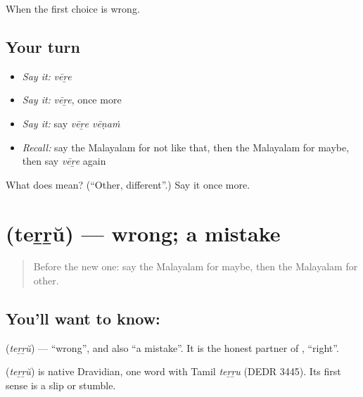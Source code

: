 \begin{grammarlens}[title={What you've built}]
When the first choice is wrong.
\end{grammarlens}

\subsection*{Your turn}
\begin{itemize}
\raggedright
  \item \emph{Say it:} \emph{vēṟe}
  \item \emph{Say it:} \emph{vēṟe}, once more
  \item \emph{Say it:} say \emph{vēṟe vēṇaṁ}
  \item \emph{Recall:} say the Malayalam for not like that, then the Malayalam for maybe, then say \emph{vēṟe} again
\end{itemize}

\begin{tcolorbox}[breakable,colback=teal!4,colframe=teal!35!black,title={Before you move on}]
What does  mean? (\textquotedblleft{}Other, different\textquotedblright{}.) Say it once more.
\end{tcolorbox}
\section[\texorpdfstring{\ml{തെറ്റ്} (teṟṟŭ)}{തെറ്റ് (teṟṟŭ)}]{ (teṟṟŭ) — wrong; a mistake}

\label{lesson:ML-C123-wrong}



\begin{quote}
Before the new one: say the Malayalam for maybe, then the Malayalam for other.
\end{quote}

\subsection*{You'll want to know: }
\textbf{} (\emph{teṟṟŭ}) — \textquotedblleft{}wrong\textquotedblright{}, and also \textquotedblleft{}a mistake\textquotedblright{}. It is the honest partner of \textbf{}, \textquotedblleft{}right\textquotedblright{}.

\begin{cousinweb}
\textbf{} (\emph{teṟṟŭ}) is native Dravidian, one word with Tamil \emph{teṟṟu} (DEDR 3445). Its first sense is a slip or stumble.
\end{cousinweb}


